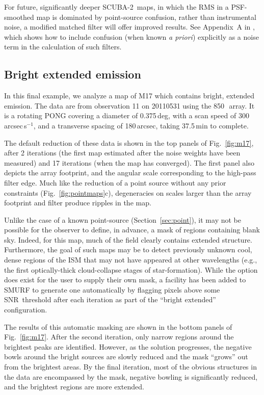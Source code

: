 \documentclass[useAMS,usenatbib,nofootinbib]{mn2e}
\newcommand{\snr}{SNR}
\newcommand{\scuba}{SCUBA-2}
\begin{document}
For future, significantly deeper \scuba\ maps, in which the RMS in a
PSF-smoothed map is dominated by point-source confusion, rather than
instrumental noise, a modified matched filter will offer improved
results. See Appendix~A in \citet{chapin2011}, which shows how to
include confusion (when known \emph{a priori}) explicitly as a noise
term in the calculation of such filters.

\subsection{Bright extended emission}
\label{sec:extended}

In this final example, we analyze a map of M17 which contains bright,
extended emission. The data are from observation 11 on 20110531 using
the 850\,\micron\ array. It is a rotating PONG covering a diameter of
0.375\,deg, with a scan speed of 300\,arcsec\,s$^{-1}$, and a
transverse spacing of 180\,arcsec, taking 37.5\,min to complete.

The default reduction of these data is shown in the top panels of
Fig.~\ref{fig:m17}, after 2 iterations (the first map estimated after
the noise weights have been measured) and 17 iterations (when the map
has converged). The first panel also depicts the array footprint, and
the angular scale corresponding to the high-pass filter edge. Much
like the reduction of a point source without any prior constraints
(Fig.~\ref{fig:pointmaps}c), degeneracies on scales larger than the
array footprint and filter produce ripples in the map.

Unlike the case of a known point-source (Section~\ref{sec:point}), it
may not be possible for the observer to define, in advance, a mask of
regions containing blank sky. Indeed, for this map, much of the field
clearly contains extended structure. Furthermore, the goal of such
maps may be to detect previously unknown cool, dense regions of the
ISM that may not have appeared at other wavelengths (e.g., the first
optically-thick cloud-collapse stages of star-formation). While the
option does exist for the user to supply their own mask, a facility
has been added to SMURF to generate one automatically by flagging
pixels above some \snr\ threshold after each iteration as part of the
``bright extended'' configuration.

The results of this automatic masking are shown in the bottom panels
of Fig.~\ref{fig:m17}. After the second iteration, only narrow regions
around the brightest peaks are identified. However, as the solution
progresses, the negative bowls around the bright sources are slowly
reduced and the mask ``grows'' out from the brightest areas. By the
final iteration, most of the obvious structures in the data are
encompassed by the mask, negative bowling is significantly reduced,
and the brightest regions are more extended.
\end{document}
